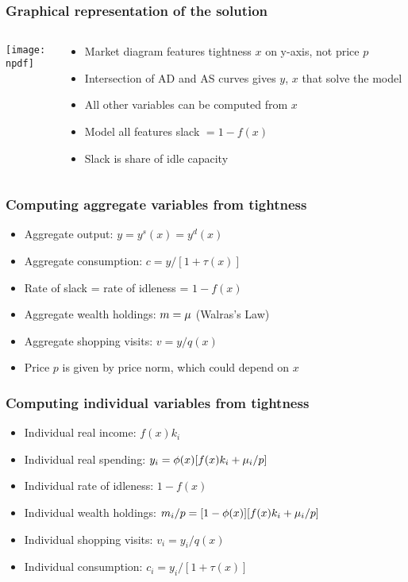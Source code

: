 \documentclass[11pt,aspectratio=169,xcolor={dvipsnames},hyperref={pdftex,pdfpagemode=UseNone,hidelinks,pdfdisplaydoctitle=true},usepdftitle=false]{beamer}
\newcommand{\npdf}{../figures/figures2.pdf}
\begin{document}
\begin{frame}
\frametitle{Graphical representation of the solution}
\begin{columns}
\begin{column}{0.6\textwidth}
\texttt{[image: \\npdf]}%
\end{column}
\begin{column}{0.4\textwidth}
\begin{itemize}
	\item Market diagram features tightness $x$ on y-axis, not price $p$
	\item Intersection of AD and AS curves gives $y$, $x$ that solve the model
	\item All other variables can be computed from $x$
	\item Model all features slack $= 1-f(x)$ 
	\item Slack is share of idle capacity
\end{itemize}
\end{column}
\end{columns} 
\end{frame}

\begin{frame}
\frametitle{Computing aggregate variables from tightness}
\begin{itemize}
\item Aggregate output: $y = y^s(x) = y^d(x)$
\item Aggregate consumption: $c = y/[1+\tau(x)]$
\item Rate of slack = rate of idleness = $1-f(x)$
\item Aggregate wealth holdings: $m = \mu$ (Walras's Law)
\item Aggregate shopping visits: $v = y/q(x)$
\item Price $p$ is given by price norm, which could depend on $x$
\end{itemize}	
\end{frame}

\begin{frame}
\frametitle{Computing individual variables from tightness}
\begin{itemize}
\item Individual real income: $f(x) k_i$
\item Individual real spending: $y_i = \phi(x) [f(x) k_i + \mu_i/p]$
\item Individual rate of idleness: $1-f(x)$
\item Individual wealth holdings: $m_i/p = [1-\phi(x)] [f(x) k_i + \mu_i/p]$
\item Individual shopping visits: $v_i = y_i/q(x)$
\item Individual consumption: $c_i = y_i/[1+\tau(x)]$
\end{itemize}	
\end{frame}
\end{document}
